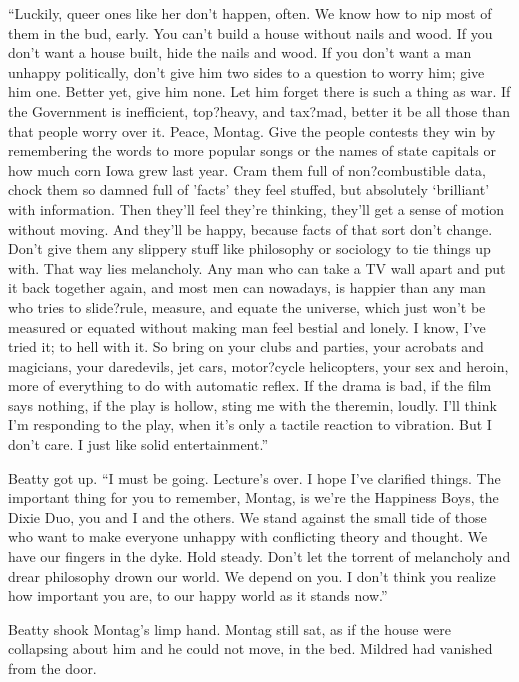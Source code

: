 \documentclass[11pt,openany]{book}
\begin{document}
``Luckily, queer ones like her don't happen, often. We know how to nip most of them in the bud, early. You can't build a house without nails and wood. If you don't want a house built, hide the nails and wood. If you don't want a man unhappy politically, don't give him two sides to a question to worry him; give him one. Better yet, give him none. Let him forget there is such a thing as war. If the Government is inefficient, top?heavy, and tax?mad, better it be all those than that people worry over it. Peace, Montag. Give the people contests they win by remembering the words to more popular songs or the names of state capitals or how much corn Iowa grew last year. Cram them full of non?combustible data, chock them so damned full of 'facts' they feel stuffed, but absolutely `brilliant' with information. Then they'll feel they're thinking, they'll get a sense of motion without moving. And they'll be happy, because facts of that sort don't change. Don't give them any slippery stuff like philosophy or sociology to tie things up with. That way lies melancholy. Any man who can take a TV wall apart and put it back together again, and most men can nowadays, is happier than any man who tries to slide?rule, measure, and equate the universe, which just won't be measured or equated without making man feel bestial and lonely. I know, I've tried it; to hell with it. So bring on your clubs and parties, your acrobats and magicians, your daredevils, jet cars, motor?cycle helicopters, your sex and heroin, more of everything to do with automatic reflex. If the drama is bad, if the film says nothing, if the play is hollow, sting me with the theremin, loudly. I'll think I'm responding to the play, when it's only a tactile reaction to vibration. But I don't care. I just like solid entertainment.''

Beatty got up. ``I must be going. Lecture's over. I hope I've clarified things. The important thing for you to remember, Montag, is we're the Happiness Boys, the Dixie Duo, you and I and the others. We stand against the small tide of those who want to make everyone unhappy with conflicting theory and thought. We have our fingers in the dyke. Hold steady. Don't let the torrent of melancholy and drear philosophy drown our world. We depend on you. I don't think you realize how important you are, to our happy world as it stands now.''

Beatty shook Montag's limp hand. Montag still sat, as if the house were collapsing about him and he could not move, in the bed. Mildred had vanished from the door.
\end{document}
